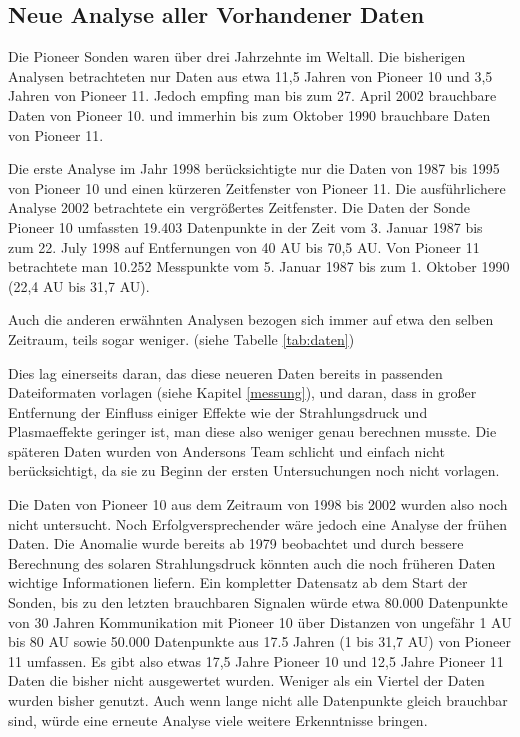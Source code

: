 \subsection{Neue Analyse aller Vorhandener Daten}
Die Pioneer Sonden waren über drei Jahrzehnte im Weltall. Die bisherigen Analysen betrachteten nur Daten aus etwa 11,5 Jahren von Pioneer 10 und 3,5 Jahren von Pioneer 11. Jedoch empfing man bis zum 27. April 2002 brauchbare Daten von Pioneer 10. und immerhin bis zum Oktober 1990 brauchbare Daten von Pioneer 11.

Die erste Analyse im Jahr 1998 berücksichtigte nur die Daten von 1987 bis 1995 von Pioneer 10 und einen kürzeren Zeitfenster von Pioneer 11. Die ausführlichere Analyse 2002 betrachtete ein vergrößertes Zeitfenster. Die Daten der Sonde Pioneer 10 umfassten 19.403 Datenpunkte in der Zeit vom 3. Januar 1987 bis zum 22. July 1998 auf Entfernungen von 40 AU bis 70,5 AU. Von Pioneer 11 betrachtete man 10.252 Messpunkte vom 5. Januar 1987 bis zum 1. Oktober 1990 (22,4 AU bis 31,7 AU).

Auch die anderen erwähnten Analysen bezogen sich immer auf etwa den selben Zeitraum, teils sogar weniger. (siehe Tabelle \ref{tab:daten})

Dies lag einerseits daran, das diese neueren Daten bereits in passenden Dateiformaten vorlagen (siehe Kapitel \ref{messung}), und daran, dass in großer Entfernung der Einfluss einiger Effekte wie der Strahlungsdruck und Plasmaeffekte geringer ist, man diese also weniger genau berechnen musste.\cite{Nieto2005} Die späteren Daten wurden von Andersons Team schlicht und einfach nicht berücksichtigt, da sie zu Beginn der ersten Untersuchungen noch nicht vorlagen. %

Die Daten von Pioneer 10 aus dem Zeitraum von 1998 bis 2002 wurden also noch nicht untersucht.
Noch Erfolgversprechender wäre jedoch eine Analyse der frühen Daten. Die Anomalie wurde bereits ab 1979 beobachtet und durch bessere Berechnung des solaren Strahlungsdruck könnten auch die noch früheren Daten wichtige Informationen liefern.
Ein kompletter Datensatz ab dem Start der Sonden, bis zu den letzten brauchbaren Signalen würde etwa 80.000 Datenpunkte von 30 Jahren Kommunikation mit Pioneer 10  über Distanzen von ungefähr 1 AU bis 80 AU sowie 50.000 Datenpunkte aus 17.5 Jahren (1 bis 31,7 AU) von Pioneer 11 umfassen.\cite{Turyshev2004} Es gibt also etwas 17,5 Jahre Pioneer 10 und 12,5 Jahre Pioneer 11 Daten die bisher nicht ausgewertet wurden. Weniger als ein Viertel der Daten wurden bisher genutzt. Auch wenn lange nicht alle Datenpunkte gleich brauchbar sind, würde eine erneute Analyse viele weitere Erkenntnisse bringen.

